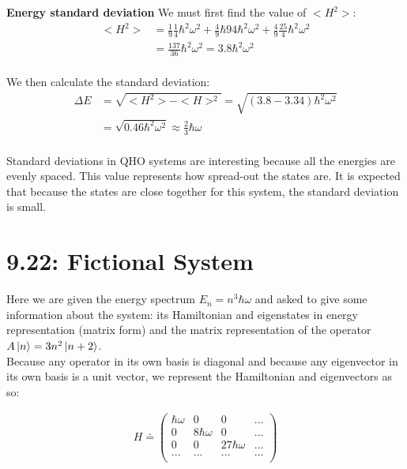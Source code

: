 \documentclass[10pt]{article} %
\begin{document}
\textbf{Energy standard deviation}
We must first find the value of $<H^2>$:
\begin{align*}
  <H^2> &= \frac{1}{9}\frac{1}{4}\hbar^2\omega^2 + \frac{4}{9}\hbar{9}{4}\hbar^2\omega^2
  + \frac{4}{9}\frac{25}{4}\hbar^2\omega^2\\
  &= \frac{137}{36}\hbar^2\omega^2 = 3.8\hbar^2\omega^2\\
\end{align*}

We then calculate the standard deviation:
\begin{align*}
  \Delta E &= \sqrt{<H^2> - <H>^2} = \sqrt{(3.8 - 3.34)\hbar^2\omega^2}\\
  &= \sqrt{0.46\hbar^2\omega^2} \approx \frac{2}{3}\hbar\omega\\
\end{align*}

Standard deviations in QHO systems are interesting because all the energies are evenly spaced. This
value represents how spread-out the states are. It is expected that because the states are close
together for this system, the standard deviation is small.

\section{9.22: Fictional System}
Here we are given the energy spectrum $E_n = n^3\hbar\omega$ and asked to give some information
about the system: its Hamiltonian and eigenstates in energy representation (matrix form)
and the matrix representation of the operator $A\ket{n} = 3n^2\ket{n+2}$.\\

Because any operator in its own basis is diagonal and because any eigenvector in its own basis is
a unit vector, we represent the Hamiltonian and eigenvectors as so:

\begin{align*}
  H \doteq
  \begin{pmatrix}
    \hbar\omega & 0 & 0 & ...\\
    0 & 8\hbar\omega & 0 & ...\\
    0 & 0 & 27\hbar\omega & ...\\
    ... & ... & ... & ...\\
  \end{pmatrix}
\end{align*}
\end{document}
